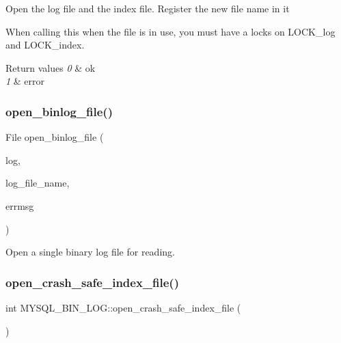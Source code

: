 \begin{DoxyItemize}
\item Open the log file and the index file. Register the new file name in it
\item When calling this when the file is in use, you must have a locks on L\+O\+C\+K\+\_\+log and L\+O\+C\+K\+\_\+index.
\end{DoxyItemize}


\begin{DoxyRetVals}{Return values}
{\em 0} & ok \\
\hline
{\em 1} & error \\
\hline
\end{DoxyRetVals}
\mbox{\label{group__Binary__Log_ga79ed24f2c1a0645530426f4346470781}} 
\subsubsection{\texorpdfstring{open\+\_\+binlog\+\_\+file()}{open\_binlog\_file()}}
{\footnotesize\ttfamily File open\+\_\+binlog\+\_\+file (\begin{DoxyParamCaption}\item[{I\+O\+\_\+\+C\+A\+C\+HE $\ast$}]{log,  }\item[{const char $\ast$}]{log\+\_\+file\+\_\+name,  }\item[{const char $\ast$$\ast$}]{errmsg }\end{DoxyParamCaption})}

Open a single binary log file for reading. \mbox{\label{group__Binary__Log_gac6d69e1ee6b9099429bd919af752a0eb}} 
\subsubsection{\texorpdfstring{open\+\_\+crash\+\_\+safe\+\_\+index\+\_\+file()}{open\_crash\_safe\_index\_file()}}
{\footnotesize\ttfamily int M\+Y\+S\+Q\+L\+\_\+\+B\+I\+N\+\_\+\+L\+O\+G\+::open\+\_\+crash\+\_\+safe\+\_\+index\+\_\+file (\begin{DoxyParamCaption}{ }\end{DoxyParamCaption})}

